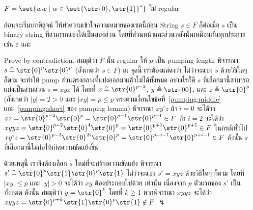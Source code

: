 \begin{example}\label{ex:twice-string-nonreg}
$F=\set{ww\mid w\in\set{\str{0},\str{1}}^*}$ ไม่ regular

ก่อนจะเริ่มบทพิสูจน์ ให้ทำความเข้าใจความหมายของเซตนี้ก่อน \enskip String $s\in F$ ก็ต่อเมื่อ $s$ เป็น binary string ที่สามารถแบ่งได้เป็นสองส่วน โดยที่ส่วนหน้าและส่วนหลังนั้นเหมือนกันทุกประการ เช่น $\varepsilon$ และ 

Prove by contradiction.  สมมุติว่า $F$ นั้น regular \enskip ให้ $p$ เป็น pumping length \enskip พิจารณา $s\triangleq\str{0}^p\str{0}^p$ (สังเกตว่า $s\in F$) \enskip ณ จุดนี้ เราต้องแสดงว่า ไม่ว่าจะแบ่ง $s$ ด้วยวิธีใดๆ ก็ตาม จะทำให้ pump ส่วนตรงกลางที่แบ่งออกมาแล้วไม่ได้ทั้งหมด \enskip อย่างไรก็ดี $s$ ที่เลือกมานี้สามารถแบ่งเป็นสามส่วน $s=xyz$ ได้ โดยที่ $x\triangleq\str{0}^{p-2}$, $y\triangleq\str{00}$, และ $z\triangleq\str{0}^p$ (สังเกตว่า $|y|=2>0$ และ $|xy|=p\leq p$ ตรงตามเงื่อนไขข้อที่~\ref{pumping:middle} และ~\ref{pumping:short} ของ pumping lemma) \enskip พิจารณา $xy^iz$ \enskip ถ้า $i=0$ จะได้ว่า $xz=\str{0}^{p-2}\str{0}^p=\str{0}^{p-1}\str{0}^{p-1}\in F$ \enskip ถ้า $i=2$ จะได้ว่า $xyyz=\str{0}^{p-2}\str{0}^4\str{0}^p=\str{0}^{p+1}\str{0}^{p+1}\in F$ \enskip ในกรณีทั่วไป $xy^iz=\str{0}^{p-2}\str{0}^{2i}\str{0}^p=\str{0}^{p+i-1}\str{0}^{p+i-1}\in F$ \enskip ดังนั้น $s$ ที่เลือกมานี้ไม่ก่อให้เกิดความขัดแย้งขึ้น

ด้วยเหตุนี้ เราจึงต้องเลือก $s$ ใหม่ที่จะสร้างความขัดแย้ง \enskip พิจารณา $s'\triangleq\str{0}^p\str{1}\str{0}^p\str{1}$ \enskip ไม่ว่าจะแบ่ง $s'=xyz$ ด้วยวิธีใดๆ ก็ตาม โดยที่ $|xy|\leq p$ และ $|y|>0$ จะได้ว่า $xy$ ต้องประกอบไปด้วย  เท่านั้น เนื่องจาก $p$ ตัวแรกของ $s'$ เป็น  ทั้งหมด \enskip ดังนั้น สมมุติว่า $y=\str{0}^k$ โดยที่ $k\geq 1$ \enskip หากพิจารณา $xyyz$ จะได้ว่า $xyyz=\str{0}^{p+k}\str{1}\str{0}^p\str{1}\notin F$ $\lightning$
\end{example}
